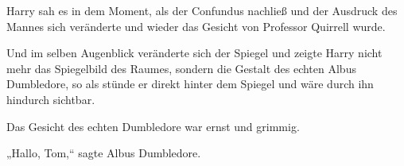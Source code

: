 Harry sah es in dem Moment, als der Confundus nachließ und der Ausdruck des Mannes sich veränderte und wieder das Gesicht von Professor Quirrell wurde.

Und im selben Augenblick veränderte sich der Spiegel und zeigte Harry nicht mehr das Spiegelbild des Raumes, sondern die Gestalt des echten Albus Dumbledore, so als stünde er direkt hinter dem Spiegel und wäre durch ihn hindurch sichtbar.

Das Gesicht des echten Dumbledore war ernst und grimmig.

„Hallo, Tom,“ sagte Albus Dumbledore.

